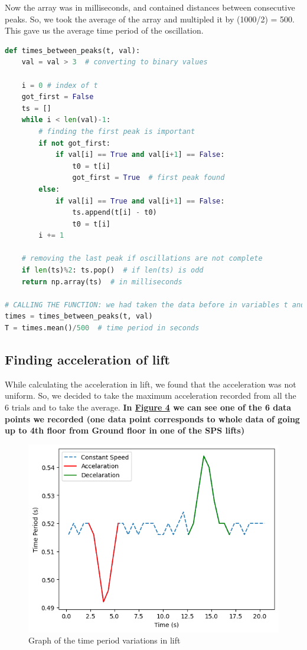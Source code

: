 	Now the array was in milliseconds, and contained distances between consecutive peaks. So, we took the average of the array and multipled it by (1000/2) = 500. This gave us the average time period of the oscillation.
	
	\begin{lstlisting}[language=Python, caption={Python code to find the time period of the oscillation.}, label={code:time_period}]
def times_between_peaks(t, val):
	val = val > 3  # converting to binary values

	i = 0 # index of t
	got_first = False
	ts = []
	while i < len(val)-1:
		# finding the first peak is important
		if not got_first:
			if val[i] == True and val[i+1] == False:
				t0 = t[i]
				got_first = True  # first peak found
		else:
			if val[i] == True and val[i+1] == False:
				ts.append(t[i] - t0)
				t0 = t[i]
		i += 1

	# removing the last peak if oscillations are not complete
	if len(ts)%2: ts.pop()  # if len(ts) is odd
	return np.array(ts)  # in milliseconds

# CALLING THE FUNCTION: we had taken the data before in variables t and val
times = times_between_peaks(t, val)
T = times.mean()/500  # time period in seconds \end{lstlisting}

\subsection{Finding acceleration of lift}
	
	While calculating the acceleration in lift, we found that the acceleration was not uniform. So, we decided to take the maximum acceleration recorded from all the 6 trials and to take the average. \textbf{In \hyperref[th:4]{Figure 4} we can see one of the 6 data points we recorded (one data point corresponds to whole data of  going up to 4th floor from Ground floor in one of the SPS lifts)}

	\begin{figure}
		\centering
		\includegraphics[width=0.75\columnwidth]{images/example_graph2.png}
		\caption{Graph of the time period variations in lift}
		\label{th:4}
	\end{figure}